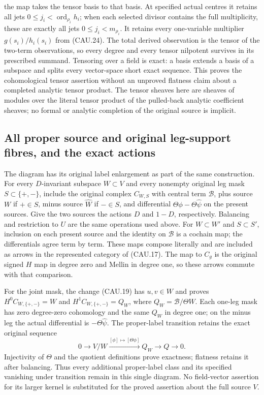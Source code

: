 the map takes the tensor basis to that basis.  At specified actual
centres it retains all jets $0\le j_i<\operatorname{ord}_{\rho_i}h_i$;
when each selected divisor contains the full multiplicity, these are
exactly all jets $0\le j_i<m_{\rho_i}$.  It retains every
one-variable multiplier $g(s_i)/h_i(s_i)$ from (CAU.24).
The total derived observation is the tensor of the two-term observations,
so every degree and every tensor nilpotent survives in its prescribed
summand.  Tensoring over a field is exact: a basis extends a basis of
a subspace and splits every vector-space short exact sequence.
This proves the cohomological tensor assertion without an unproved
flatness claim about a completed analytic tensor product.
The tensor sheaves here are sheaves of modules over the literal tensor
product of the pulled-back analytic coefficient sheaves; no formal or
analytic completion of the original source is implicit.

\subsection{All proper source and original leg-support fibres, and the exact actions}

The diagram has its original label enlargement as part of the same
construction.  For every $D$-invariant subspace $W\subset V$ and every
nonempty original leg mask $S\subset\{+,-\}$, include the original complex
$C_{W,S}$ with central term $\mathscr B$, plus source $W$ if
$+\in S$, minus source $\widehat W$ if $-\in S$, and differential
$\Theta\phi-\Theta\widehat\psi$ on the present sources.
Give the two sources the actions $D$ and $1-D$, respectively.
Balancing and restriction to $U$ are the same operations used above.
For $W\subset W'$ and $S\subset S'$, inclusion on each present
source and the identity on $\mathscr B$ is a cochain map; the
differentials agree term by term.  These maps compose literally and
are included as arrows in the represented category of (CAU.17).
The map to $C_g$ is the original signed $H$ map in degree zero and
Mellin in degree one, so these arrows commute with that comparison.

For the joint mask, the change (CAU.19) has $u,v\in W$ and proves
$H^0C_{W,\{+,-\}}=W$ and $H^1C_{W,\{+,-\}}=Q_W$,
where $Q_W=\mathscr B/\Theta W$.  Each one-leg mask has zero
degree-zero cohomology and the same $Q_W$ in degree one; on the minus
leg the actual differential is $-\Theta\widehat\psi$.
The proper-label transition retains the exact original sequence
\[
 0\longrightarrow V/W\xrightarrow{[\phi]\mapsto[\Theta\phi]}
 Q_W\longrightarrow Q\longrightarrow0.                       \tag{CAU.28}
\]
Injectivity of $\Theta$ and the quotient definitions prove exactness;
flatness retains it after balancing.  Thus every additional proper-label
class and its specified vanishing under transition remain in this single
diagram.  No field-vector assertion for its larger kernel is substituted
for the proved assertion about the full source $V$.

